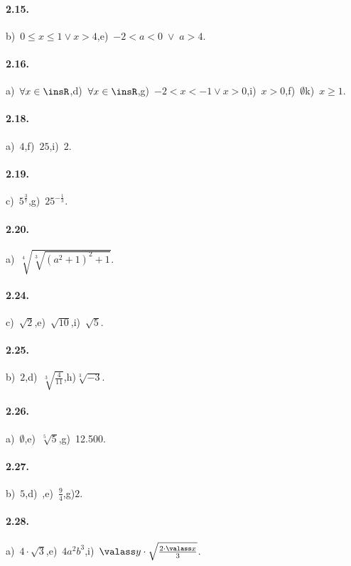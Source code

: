 \paragraph{2.15.}
b)~$0\le x\le 1\vee x>4$,\quad e)~$-2<a<0\;\vee \;a>4$.

\paragraph{2.16.}
a)~$\forall x\in \insR$,\quad d)~$\forall x\in \insR$,\quad g)~$-2<x<-1 \vee x>0$,\quad i)~$x>0$,\quad f)~$\emptyset$\quad k)~$x\ge 1$.

\paragraph{2.18.}
a)~$4$,\quad f)~$25$,\quad i)~$2$.

\paragraph{2.19.}
c)~$5^{\frac 3 7}$,\quad g)~$25^{-\frac 1 3}$.

\paragraph{2.20.}
a)~$\sqrt[4]{\sqrt[3]{(a^2+1)^2+1}}$.

\paragraph{2.24.}
c)~$\sqrt 2$,\quad e)~$\sqrt{10}$,\quad i)~$\sqrt 5$.

\paragraph{2.25.}
b)~$2$,\quad d)~$\sqrt[3]{\frac 4{11}}$,\quad h)$\sqrt[3]{-3}$.

\paragraph{2.26.}
a)~$\emptyset$,\quad e)~$\sqrt[5]5$,\quad g)~12.500.

\paragraph{2.27.}
b)~$5$,\quad d)~,\quad e)~$\frac 9 4$,\quad g)$2$.

\paragraph{2.28.}
a)~$4\cdot \sqrt 3$,\quad e)~$4a^2b^3$,\quad i)~$\valass y \cdot \sqrt{\frac{2\cdot \valass x} 3}$.

